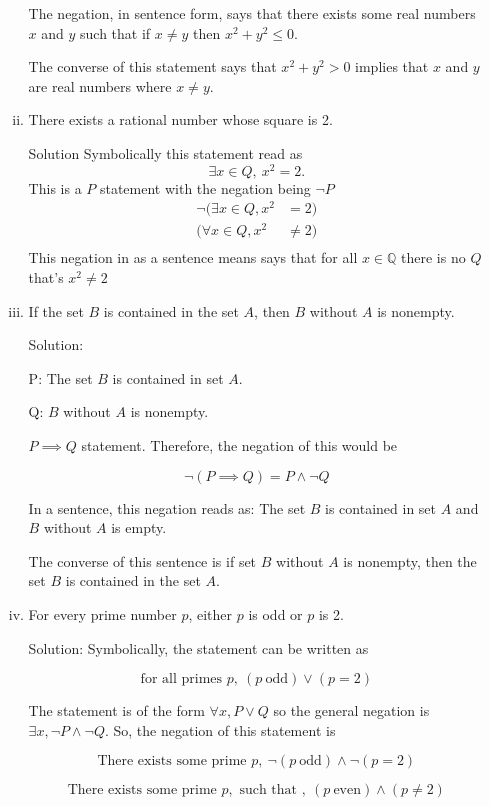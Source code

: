 \documentclass[11pt]{amsart}
\newcommand{\Q}{\mathbb{Q}}
\begin{document}
\begin{enumerate}
\begin{enumerate}[(i)]
The negation, in sentence form,  says that there exists some real numbers $x$ and $y$ such that if $x \neq y$ then $x^2 + y^2 \leq 0$.

The converse of this statement says that $x^2 + y^2 > 0$ implies that $x$ and $y$ are real numbers where $x \neq y$.

\item There exists a rational number whose square is 2.

Solution Symbolically this statement read as 
\[ 
\exists x \in Q, \ x^2 = 2.
\]
This is a $P$ statement with the negation being $\neg P$
\begin{align*}
    \neg(\exists x \in Q, x^2 &= 2)\\
    (\forall x \in Q, x^2 & \neq 2)\\
\end{align*}
This negation in as a sentence means says that for all $x \in \Q$ there is no $Q$ that's $x^2 \neq 2$


\item If the set $B$ is contained in the set $A$, then $B$ without $A$ is nonempty.

Solution: 

P: The set $B$ is contained in set $A$.

Q: $B$ without $A$ is nonempty. 

$P \implies Q$ statement. Therefore, the negation of this would be 

\[
    \neg(P \implies Q) = P \wedge \neg Q
\]

In a sentence, this negation reads as: The set $B$ is contained in set $A$ and $B$ without $A$ is empty.

The converse of this sentence is if set $B$ without $A$ is nonempty, then the set $B$ is contained in the set $A$.

\item For every prime number $p$, either $p$ is odd or $p$ is 2.

Solution: Symbolically, the statement can be written as 

\[ 
    \text{for all primes } p, \ (p \ \text{odd}) \vee ( p = 2)
\]

The statement is of the form $\forall x, P \vee Q $ so the general negation is $ \exists x, \neg P \wedge \neg Q$. So, the negation of this statement is 

\[
    \text{There exists some prime } p, \ \neg (p \ \text{odd}) \wedge \neg (p = 2)
\]
    
\[
    \text{There exists some prime } p, \text{ such that }, \  (p \ \text{even}) \wedge (p \neq 2)
\]


\end{enumerate}
\end{enumerate}
\end{document}
